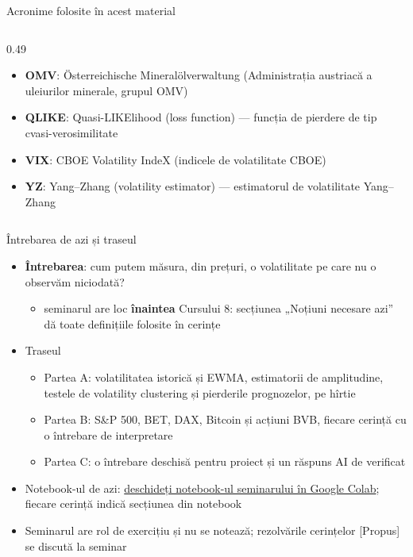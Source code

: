 \begin{frame}{Acronime folosite în acest material}
\begin{columns}[T]
\begin{column}{0.49\textwidth}
\begin{itemize}
    \item \textbf{OMV}: Österreichische Mineralölverwaltung (Administrația austriacă a uleiurilor minerale, grupul OMV)
    \item \textbf{QLIKE}: Quasi-LIKElihood (loss function) — funcția de pierdere de tip cvasi-verosimilitate
    \item \textbf{VIX}: CBOE Volatility IndeX (indicele de volatilitate CBOE)
    \item \textbf{YZ}: Yang–Zhang (volatility estimator) — estimatorul de volatilitate Yang–Zhang
\end{itemize}
\end{column}
\end{columns}
\end{frame}

\begin{frame}{Întrebarea de azi și traseul}
\itemsize{\small}
\begin{itemize}
    \item \textbf{Întrebarea}: cum putem măsura, din prețuri, o volatilitate pe care nu o observăm niciodată?
    \begin{itemize}
        \item seminarul are loc \textbf{înaintea} Cursului 8: secțiunea „Noțiuni necesare azi” dă toate definițiile folosite în cerințe
    \end{itemize}
    \item Traseul
    \begin{itemize}
        \item Partea A: volatilitatea istorică și EWMA, estimatorii de amplitudine, testele de volatility clustering și pierderile prognozelor, pe hîrtie
        \item Partea B: S\&P 500, BET, DAX, Bitcoin și acțiuni BVB, fiecare cerință cu o întrebare de interpretare
        \item Partea C: o întrebare deschisă pentru proiect și un răspuns AI de verificat
    \end{itemize}
    \item Notebook-ul de azi: \href{\nb}{deschideți notebook-ul seminarului în Google Colab}; fiecare cerință indică secțiunea din notebook
    \item Seminarul are rol de exercițiu și nu se notează; rezolvările cerințelor [Propus] se discută la seminar
\end{itemize}
\end{frame}


